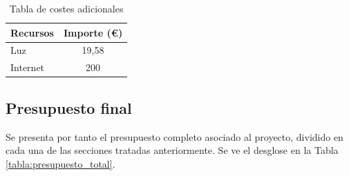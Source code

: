 \begin{table}[ht]
    \centering
    \begin{tabular}[t]{lc}
        \toprule
        \textbf{Recursos} & \textbf{Importe (€)}  \\
        \midrule
        Luz         &   19,58   \\
        Internet    &   200      \\
        \bottomrule
    \end{tabular}
    \caption{Tabla de costes adicionales}
    \label{tabla:costes_adicionales}
\end{table}




\subsection{Presupuesto final}
Se presenta por tanto el presupuesto completo asociado al proyecto, dividido en cada una de las secciones tratadas anteriormente. Se ve el desglose en la Tabla \ref{tabla:presupuesto_total}.
